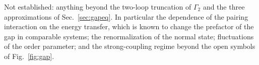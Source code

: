 Not established: anything beyond the two-loop truncation of $\Gamma_2$ and the three approximations
of Sec.~\ref{sec:gapeq}. In particular the dependence of the pairing interaction on the energy
transfer, which is known to change the prefactor of the gap in comparable systems; the
renormalization of the normal state; fluctuations of the order parameter; and the strong-coupling
regime beyond the open symbols of Fig.~\ref{fig:gap}.

